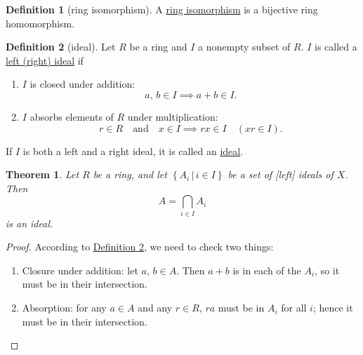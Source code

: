 \documentclass[a4paper]{report}
\newcommand{\defn}[1]{\ul{#1}}
\theoremstyle{definition}
\newtheorem{definition}{Definition}[section]
\theoremstyle{plain}
\newtheorem{theorem}{Theorem}[section]
\theoremstyle{remark}
\begin{document}
\begin{definition}[ring isomorphism]
  \label{def:ringisomorphism} 
  A \defn{ring isomorphism} is a bijective ring homomorphism.
\end{definition}

\begin{definition}[ideal]
  \label{def:ideal}
  Let $R$ be a ring and $I$ a nonempty subset of $R$. $I$ is called a \defn{left (right) ideal} if
  \begin{enumerate}
    \item $I$ is closed under addition:
      \begin{equation*}
        a,\,b \in I \implies a+b\in I.
      \end{equation*}

    \item $I$ absorbs elements of $R$ under multiplication:
      \begin{equation*}
        r \in R \quad\text{and}\quad x\in I \implies rx \in I\quad (xr \in I).
      \end{equation*}
  \end{enumerate}
  If $I$ is both a left and a right ideal, it is called an \defn{ideal}.
\end{definition}
\begin{theorem}
  Let $R$ be a ring, and let $\left\{ A_{i}\,\big|\, i \in I \right\}$ be a set of [left] ideals of $X$. Then 
  \begin{equation*}
    A = \bigcap_{i \in I}A_{i}
  \end{equation*}
  is an ideal.
  \label{thm:intersectionofidealsisideal}
\end{theorem}
\begin{proof}
  According to \hyperref[def:ideal]{Definition \ref*{def:ideal}}, we need to check two things:
  \begin{enumerate}
    \item Closure under addition: let $a$, $b\in A$. Then $a+b$ is in each of the $A_{i}$, so it must be in their intersection.
    \item Absorption: for any $a \in A$ and any $r \in R$, $ra$ must be in $A_{i}$ for all $i$; hence it must be in their intersection.
  \end{enumerate}
\end{proof}
\end{document}
